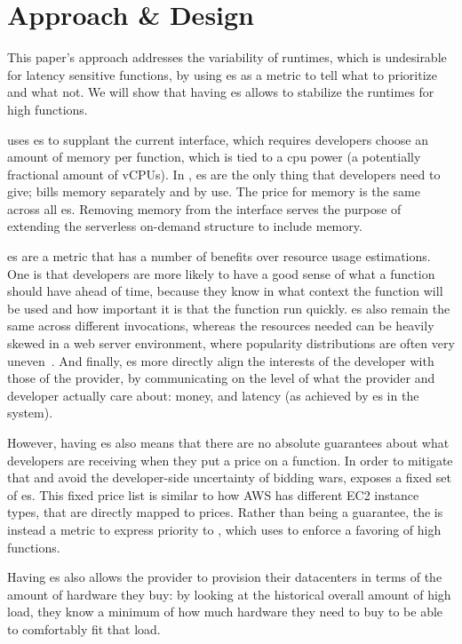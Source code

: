 \section{Approach \& Design}\label{design}

This paper's approach addresses the variability of runtimes, which is
undesirable for latency sensitive functions, by using \priceclass{}es as a
metric to tell \sys{} what to prioritize and what not. We will show that having
\priceclass{}es allows \sys{} to stabilize the runtimes for high \class{}
functions. 

\Sys{} uses \class{}es to supplant the current interface, which requires
developers choose an amount of memory per function, which is tied to a cpu power
(a potentially fractional amount of vCPUs). In \sys{}, \priceclass{}es are the
only thing that developers need to give; \sys{} bills memory separately and by
use. The price for memory is the same across all \class{}es. Removing memory
from the interface serves the purpose of extending the serverless on-demand
structure to include memory.

\Priceclass{}es are a metric that has a number of benefits over resource usage
estimations. One is that developers are more likely to have a good sense of
what \priceclass{} a function should have ahead of time, because they know in
what context the function will be used and how important it is that the function
run quickly. \Priceclass{}es also remain the same across different invocations,
whereas the resources needed can be heavily skewed in a web server environment,
where popularity distributions are often very
uneven~\cite{hermod,serverless-in-the-wild}. And finally, \class{}es more
directly align the interests of the developer with those of the provider, by
communicating on the level of what the provider and developer actually care
about: money, and latency (as achieved by \class{}es in the system).

However, having \priceclass{}es also means that there are no absolute guarantees
about what developers are receiving when they put a price on a function. In
order to mitigate that and avoid the developer-side uncertainty of bidding wars,
\sys{} exposes a fixed set of \priceclass{}es. This fixed price list is similar
to how AWS has different EC2 instance types, that are directly mapped to prices.
Rather than being a guarantee, the \priceclass{} is instead a metric to express
priority to \sys{}, which \sys{} uses to enforce a favoring of high \class{}
functions.

Having \priceclass{}es also allows the provider to provision their datacenters
in terms of the amount of hardware they buy: by looking at the historical
overall amount of high \priceclass{} load, they know a minimum of how much
hardware they need to buy to be able to comfortably fit that load.


